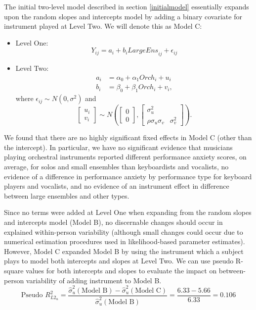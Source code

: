 \documentclass[
]{krantz}
\begin{document}
The initial two-level model described in section \ref{initialmodel} essentially expands upon the random slopes and intercepts model by adding a binary covariate for instrument played at Level Two. We will denote this as Model C:

\begin{itemize}
\item
  Level One:
  \begin{equation}
  Y_{ij} = a_{i}+b_{i}\textstyle{LargeEns}_{ij}+\epsilon_{ij}
  \label{eq:level1modelc}
  \end{equation}
\item
  Level Two:
  \begin{align*}
  a_{i} & = \alpha_{0}+\alpha_{1}\textstyle{Orch}_{i}+u_{i} \\
  b_{i} & = \beta_{0}+\beta_{1}\textstyle{Orch}_{i}+v_{i},
  \end{align*}
  where \(\epsilon_{ij}\sim N(0,\sigma^2)\) and
  \[ \left[ \begin{array}{c}
            u_{i} \\ v_{i}
          \end{array}  \right] \sim N \left( \left[
          \begin{array}{c}
            0 \\ 0
          \end{array} \right], \left[
          \begin{array}{cc}
            \sigma_{u}^{2} & \\
            \rho\sigma_{u}\sigma_{v} & \sigma_{v}^{2}
          \end{array} \right] \right). \]
\end{itemize}

We found that there are no highly significant fixed effects in Model C (other than the intercept). In particular, we have no significant evidence that musicians playing orchestral instruments reported different performance anxiety scores, on average, for solos and small ensembles than keyboardists and vocalists, no evidence of a difference in performance anxiety by performance type for keyboard players and vocalists, and no evidence of an instrument effect in difference between large ensembles and other types.

Since no terms were added at Level One when expanding from the random slopes and intercepts model (Model B), no discernable changes should occur in explained within-person variability (although small changes could occur due to numerical estimation procedures used in likelihood-based parameter estimates). However, Model C expanded Model B by using the instrument which a subject plays to model both intercepts and slopes at Level Two. We can use pseudo R-square values for both intercepts and slopes to evaluate the impact on between-person variability of adding instrument to Model B.
\begin{equation}
\textrm{Pseudo }R^2_{L2_u} = \frac{\hat{\sigma}_{u}^{2}(\textrm{Model B})-\hat{\sigma}_{u}^{2}(\textrm{Model C})}{\hat{\sigma}_{u}^{2}(\textrm{Model B})} = \frac{6.33-5.66}{6.33} = 0.106
\label{eq:pseudol0}
\end{equation}
\end{document}
